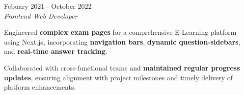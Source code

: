 \documentclass[../main.tex]{subfiles}
\begin{document}
\vspace{0.4 cm}

\begin{twocolentry}{
		Febuary 2021 - October 2022
	}
	 \\
	\vspace{0.10 cm}
	\textit{Frontend Web Developer}
\end{twocolentry}
\vspace{0.10 cm}
\begin{onecolentry}
	\begin{highlights}
		\item Engineered \textbf{complex exam pages} for a comprehensive E-Learning platform using Next.js, incorporating \textbf{navigation bars}, \textbf{dynamic question-sidebars}, and \textbf{real-time answer tracking}.
		\item Collaborated with cross-functional teams and \textbf{maintained regular progress updates}, ensuring alignment with project milestones and timely delivery of platform enhancements.
	\end{highlights}
\end{onecolentry}
\end{document}
